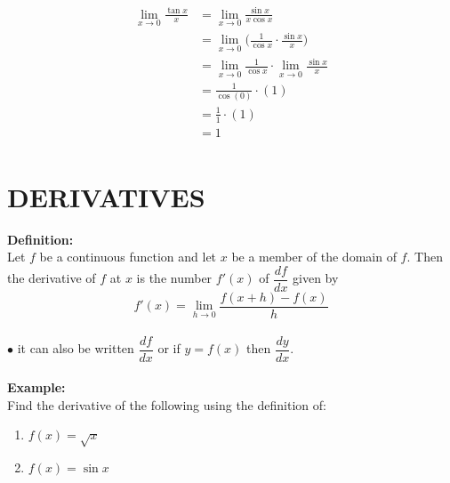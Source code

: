 \documentclass[11pt,a4paper]{article}
\begin{document}
\begin{align*}
\lim_{x\longrightarrow 0}\frac{\tan x}{x} & = \lim_{x\longrightarrow 0} \frac{\sin x}{x\cos x}\\
                                          & = \lim_{x\longrightarrow 0} \bigg(\frac{1}{\cos x}\cdot \frac{\sin x}{x}\bigg)\\
                                          & = \lim_{x\longrightarrow 0}\frac{1}{\cos x}\cdot \lim_{x\longrightarrow 0}\frac{\sin x}{x}\\
                                          & = \frac{1}{\cos (0)}\cdot (1)\\
                                          & = \frac{1}{1}\cdot (1)\\
                                          & = 1\\
\end{align*}


















\pagebreak
\section{DERIVATIVES}
\textbf{Definition:}\\
Let $f$ be a continuous function and let $x$ be a member of the domain of $f$. Then the derivative of $f$ at $x$ is the number $f'(x)$ of $\dfrac{df}{dx}$ given by\\ $$f'(x)=\lim \limits_{h \longrightarrow 0} \frac{f(x+h)-f(x)}{h}$$\\
$\bullet$ it can also be written $\dfrac{df}{dx}$ or if $y=f(x)$ then $\dfrac{dy}{dx}$.\\\\

\textbf{Example:}\\
Find the derivative of the following using the definition of:
\begin{enumerate}
\item[(i).] $f(x)=\sqrt{x}$
\item[(ii).] $f(x)=\sin x$\\\\
\end{enumerate}
\end{document}
